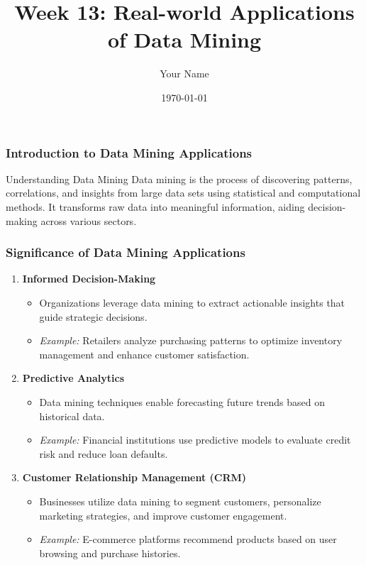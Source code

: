 \documentclass{beamer}
\title{Week 13: Real-world Applications of Data Mining}
\author{Your Name}
\institute{Your Institution}
\date{\today}
\begin{document}
\frame{\titlepage}

\begin{frame}[fragile]
    \frametitle{Introduction to Data Mining Applications}
    \begin{block}{Understanding Data Mining}
        Data mining is the process of discovering patterns, correlations, and insights from large data sets using statistical and computational methods. It transforms raw data into meaningful information, aiding decision-making across various sectors.
    \end{block}
\end{frame}

\begin{frame}[fragile]
    \frametitle{Significance of Data Mining Applications}
    \begin{enumerate}
        \item \textbf{Informed Decision-Making}
        \begin{itemize}
            \item Organizations leverage data mining to extract actionable insights that guide strategic decisions.
            \item \textit{Example:} Retailers analyze purchasing patterns to optimize inventory management and enhance customer satisfaction.
        \end{itemize}

        \item \textbf{Predictive Analytics}
        \begin{itemize}
            \item Data mining techniques enable forecasting future trends based on historical data.
            \item \textit{Example:} Financial institutions use predictive models to evaluate credit risk and reduce loan defaults.
        \end{itemize}

        \item \textbf{Customer Relationship Management (CRM)}
        \begin{itemize}
            \item Businesses utilize data mining to segment customers, personalize marketing strategies, and improve customer engagement.
            \item \textit{Example:} E-commerce platforms recommend products based on user browsing and purchase histories.
        \end{itemize}
    \end{enumerate}
\end{frame}
\end{document}
